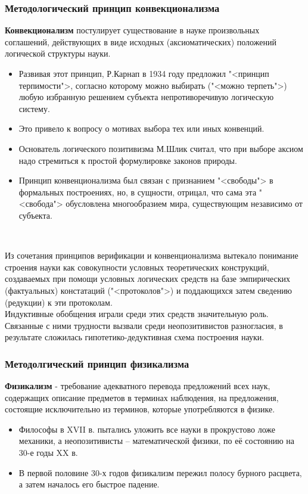 \documentclass[main.tex]{subfiles}
\begin{document}
\subsubsection{Методологический принцип конвекционализма}

{\parindent0pt
\textbf{Конвекционализм} постулирует существование в науке произвольных соглашений, действующих в виде исходных (аксиоматических) положений логической структуры науки.
\begin{itemize}[nosep,leftmargin=0.5cm]
\item Развивая этот принцип, Р.Карнап в 1934 году предложил "<принцип терпимости">, согласно которому можно выбирать ("<можно терпеть">) любую избранную решением субъекта непротиворечивую логическую систему.
\item Это привело к вопросу о мотивах выбора тех или иных конвенций.
\item Основатель логического позитивизма М.Шлик считал, что при выборе аксиом надо стремиться к простой формулировке законов природы.
\item Принцип конвенционализма был связан с признанием "<свободы"> в формальных построениях, но, в сущности, отрицал, что сама эта "<свобода"> обусловлена многообразием мира, существующим независимо от субъекта.
\end{itemize}
}
\ 

{\parindent0pt
Из сочетания принципов верификации и конвенционализма вытекало понимание строения науки как совокупности условных теоретических конструкций, создаваемых при помощи условных логических средств на базе эмпирических (фактуальных) констатаций ("<протоколов">) и поддающихся затем сведению (редукции) к эти протоколам.
}
\ \\

{\parindent0pt
Индуктивные обобщения играли среди этих средств значительную роль.
Связанные с ними трудности вызвали среди неопозитивистов разногласия, в результате сложилась гипотетико-дедуктивная схема построения науки.
}



\subsubsection{Методолгический принцип физикализма}

{\parindent0pt
\textbf{Физикализм} - требование адекватного перевода предложений всех наук, содержащих описание предметов в терминах наблюдения, на предложения, состоящие исключительно из терминов, которые употребляются в физике.
\begin{itemize}[nosep,leftmargin=0.5cm]
\item Философы в XVII в. пытались уложить все науки в прокрустово ложе механики, а неопозитивисты -- математической физики, по её состоянию на 30-е годы XX в.
\item В первой половине 30-х годов физикализм пережил полосу бурного расцвета, а затем началось его быстрое падение.
\end{itemize}
}
\ 
\end{document}
